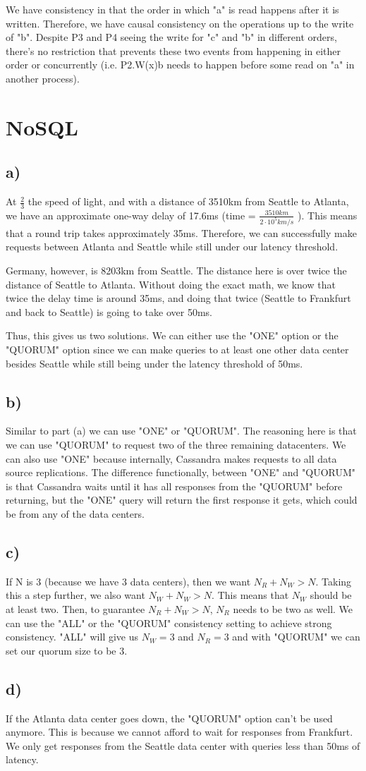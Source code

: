 \documentclass[12pt]{article}
\begin{document}
We have consistency in that the order in which "a" is read happens after it is written. Therefore, we have causal consistency on the operations up to the write of "b".
Despite P3 and P4 seeing the write for "c" and "b" in different orders, there's no restriction that prevents these two events from happening in either order or concurrently (i.e. P2.W(x)b needs to happen before some read on "a" in another process).

\section{NoSQL}
\subsection*{a)}
At $ \frac{2}{3} $ the speed of light, and with a distance of 3510km from Seattle to Atlanta, we have an approximate one-way delay of 17.6ms (time = $\frac{3510km}{2\cdot 10^5 km/s}$ ). This means that a round trip takes approximately 35ms. Therefore, we can successfully make requests between Atlanta and Seattle while still under our latency threshold.

Germany, however, is 8203km from Seattle. The distance here is over twice the distance of Seattle to Atlanta. Without doing the exact math, we know that twice the delay time is around 35ms, and doing that twice (Seattle to Frankfurt and back to Seattle) is going to take over 50ms.

Thus, this gives us two solutions. We can either use the "ONE" option or the "QUORUM" option since we can make queries to at least one other data center besides Seattle while still being under the latency threshold of 50ms.
\subsection*{b)}
Similar to part (a) we can use "ONE" or "QUORUM". The reasoning here is that we can use "QUORUM" to request two of the three remaining datacenters. We can also use "ONE" because internally, Cassandra makes requests to all data source replications. The difference functionally, between "ONE" and "QUORUM" is that Cassandra waits until it has all responses from the "QUORUM" before returning, but the "ONE" query will return the first response it gets, which could be from any of the data centers.
\subsection*{c)}
If N is 3 (because we have 3 data centers), then we want $N_R + N_W > N$. Taking this a step further, we also want $N_W + N_W > N$. This means that $N_W$ should be at least two. Then, to guarantee $N_R + N_W > N$, $N_R$ needs to be two as well.
We can use the "ALL" or the "QUORUM" consistency setting to achieve strong consistency. "ALL" will give us $N_W=3$ and $N_R=3$ and with "QUORUM" we can set our quorum size to be 3.
\subsection*{d)}
If the Atlanta data center goes down, the "QUORUM" option can't be used anymore. This is because we cannot afford to wait for responses from Frankfurt. We only get responses from the Seattle data center with queries less than 50ms of latency.
\end{document}
